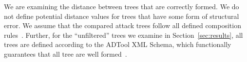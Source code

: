 We are examining the distance between trees that are correctly formed. We do not define potential distance values for trees that have some form of structural error. We assume that the compared attack trees follow all defined composition rules~\cite{mauw_foundations_2006}. Further, for the ``unfiltered'' trees we examine in Section~\ref{sec:results}, all trees are defined according to the ADTool XML Schema, which functionally guarantees that all tree are well formed~\cite{kordy_adtool_2013}.



























